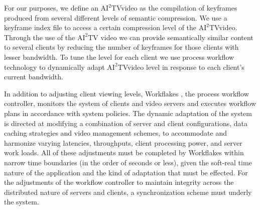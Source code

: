 \documentclass[10pt]{article}
\newcommand{\aiitv}[0]{$\mathrm{AI}^2$TV}
\begin{document}
For our purposes, we define an \aiitv video as the compilation of
keyframes produced from several different levels of semantic
compression.  We use a keyframe index file to access a certain
compression level of the \aiitv video.  Through the use of the \aiitv
video we can provide semantically similar content to several clients
by reducing the number of keyframes for those clients with lesser
bandwidth.  To tune the level for each client we use process workflow
technology to dynamically adapt \aiitv video level in response to each
client's current bandwidth.

In addition to adjusting client viewing levels, Workflakes
\citep{PEPPO}, the process workflow controller, monitors the system of
clients and video servers and executes workflow plans in accordance
with system policies.  The dynamic adaptation of the system is
directed at modifying a combination of server and client
configurations, data caching strategies and video management schemes,
to accommodate and harmonize varying latencies, throughputs, client
processing power, and server work loads. All of these adjustments must
be completed by Workflakes within narrow time boundaries (in the order
of seconds or less), given the soft-real time nature of the
application and the kind of adaptation that must be effected.  For the
adjustments of the workflow controller to maintain integrity across
the distributed nature of servers and clients, a synchronization
scheme must underly the system.


\end{document}
